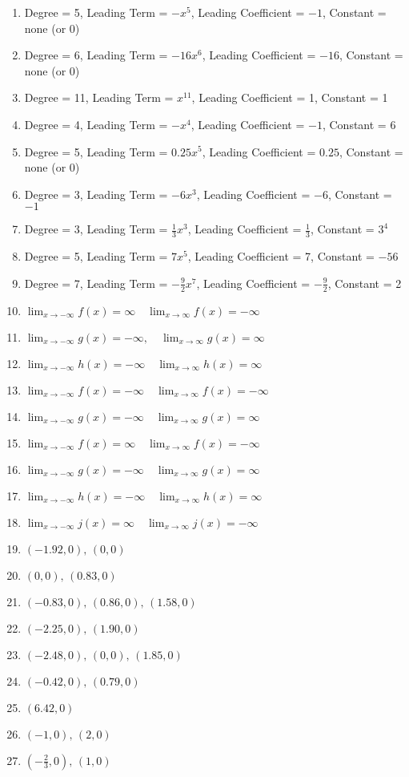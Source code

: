 \begin{enumerate}
	\item Degree = 5, Leading Term = $-x^5$, Leading Coefficient = $-1$, Constant = none (or 0)
	\item Degree = 6, Leading Term = $-16x^6$, Leading Coefficient = $-16$, Constant = none (or 0)
	\item Degree = 11, Leading Term = $x^{11}$, Leading Coefficient = 1, Constant = 1
	\item Degree = 4, Leading Term = $-x^4$, Leading Coefficient = $-1$, Constant = 6
	\item Degree = 5, Leading Term = $0.25x^5$, Leading Coefficient = $0.25$, Constant = none (or 0)
	\item Degree = 3, Leading Term = $-6x^3$, Leading Coefficient = $-6$, Constant = $-1$
	\item Degree = 3, Leading Term = $\frac{1}{3}x^3$, Leading Coefficient = $\frac{1}{3}$, Constant = $3^4$
	\item Degree = 5, Leading Term = $7x^5$, Leading Coefficient = 7, Constant = $-56$
	\item Degree = 7, Leading Term = $-\frac{9}{2}x^7$, Leading Coefficient = $-\frac{9}{2}$, Constant = 2
	\item $\displaystyle \lim_{x \to -\infty} f(x) = \infty \quad \lim_{x \to \infty}f(x) = -\infty$
	\item $\displaystyle \lim_{x \to -\infty} g(x) = -\infty, \quad \lim_{x \to \infty}g(x) = \infty$
	\item $\displaystyle \lim_{x \to -\infty} h(x) = -\infty \quad \lim_{x \to \infty}h(x) =\infty$
	\item $\displaystyle \lim_{x \to -\infty}f(x) = -\infty \quad \lim_{x \to \infty}f(x) = -\infty$
    \item $\displaystyle \lim_{x \to -\infty}g(x) = -\infty \quad \lim_{x \to \infty}g(x) = \infty$
    \item $\displaystyle \lim_{x \to -\infty} f(x) = \infty \quad \lim_{x \to \infty} f(x) = - \infty$
    \item $\displaystyle \lim_{x \to -\infty} g(x) = -\infty \quad \lim_{x \to \infty} g(x) = \infty$
    \item $\displaystyle \lim_{x \to -\infty} h(x) = -\infty \quad \lim_{x \to \infty} h(x) = \infty$
     \item $\displaystyle \lim_{x \to -\infty} j(x) = \infty \quad \lim_{x \to \infty} j(x) = -\infty$
     \item $(-1.92,0), \, (0,0)$
     \item $(0,0), \, (0.83,0)$
     \item $(-0.83,0), \, (0.86,0), \, (1.58,0)$
     \item $(-2.25,0), \, (1.90,0)$
     \item $(-2.48,0), \, (0,0), \, (1.85,0)$
     \item $(-0.42,0), \, (0.79,0)$
     \item $(6.42,0)$
     \item $(-1,0), \, (2,0)$
     \item $\left(-\frac{2}{3},0\right), \, (1,0)$
\end{enumerate}